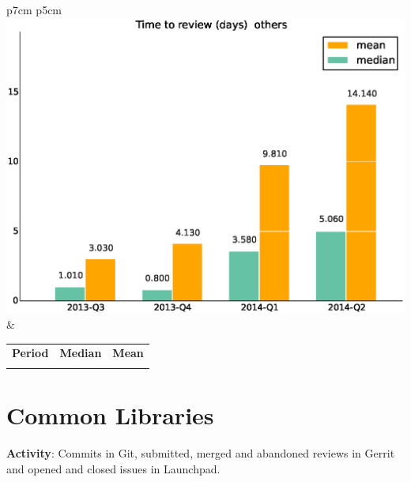\documentclass[a4wide,11pt]{report}
\begin{document}
\begin{tabular}{p{7cm} p{5cm}}
    \vspace{0pt} 
    \includegraphics[scale=.35]{figs/timetoreview_medianothers.eps}
    & 
    \vspace{0pt}
    \begin{tabular}{l|r|r|}%
    \bfseries Period & \bfseries Median & \bfseries Mean %
    \csvreader[head to column names]{data/timetoreview_medianothers.csv}{}%
    {\\ & \mediantime & \meantime}
    \end{tabular}
\end{tabular}

\newpage
\section{Common Libraries}

\textbf{Activity}: Commits in Git, submitted, merged and abandoned reviews in Gerrit and opened and closed issues in Launchpad.
\end{document}
